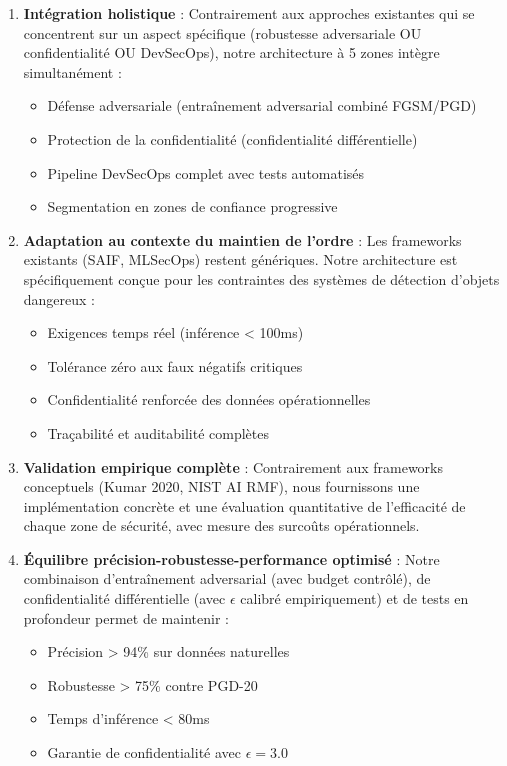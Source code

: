 \begin{enumerate}
    \item \textbf{Intégration holistique} : Contrairement aux approches existantes qui se concentrent sur un aspect spécifique (robustesse adversariale OU confidentialité OU DevSecOps), notre architecture à 5 zones intègre simultanément :
    \begin{itemize}
        \item Défense adversariale (entraînement adversarial combiné FGSM/PGD)
        \item Protection de la confidentialité (confidentialité différentielle)
        \item Pipeline DevSecOps complet avec tests automatisés
        \item Segmentation en zones de confiance progressive
    \end{itemize}

    \item \textbf{Adaptation au contexte du maintien de l'ordre} : Les frameworks existants (SAIF, MLSecOps) restent génériques. Notre architecture est spécifiquement conçue pour les contraintes des systèmes de détection d'objets dangereux :
    \begin{itemize}
        \item Exigences temps réel (inférence < 100ms)
        \item Tolérance zéro aux faux négatifs critiques
        \item Confidentialité renforcée des données opérationnelles
        \item Traçabilité et auditabilité complètes
    \end{itemize}

    \item \textbf{Validation empirique complète} : Contrairement aux frameworks conceptuels (Kumar 2020, NIST AI RMF), nous fournissons une implémentation concrète et une évaluation quantitative de l'efficacité de chaque zone de sécurité, avec mesure des surcoûts opérationnels.

    \item \textbf{Équilibre précision-robustesse-performance optimisé} : Notre combinaison d'entraînement adversarial (avec budget contrôlé), de confidentialité différentielle (avec $\epsilon$ calibré empiriquement) et de tests en profondeur permet de maintenir :
    \begin{itemize}
        \item Précision > 94\% sur données naturelles
        \item Robustesse > 75\% contre PGD-20
        \item Temps d'inférence < 80ms
        \item Garantie de confidentialité avec $\epsilon = 3.0$
    \end{itemize}
\end{enumerate}

